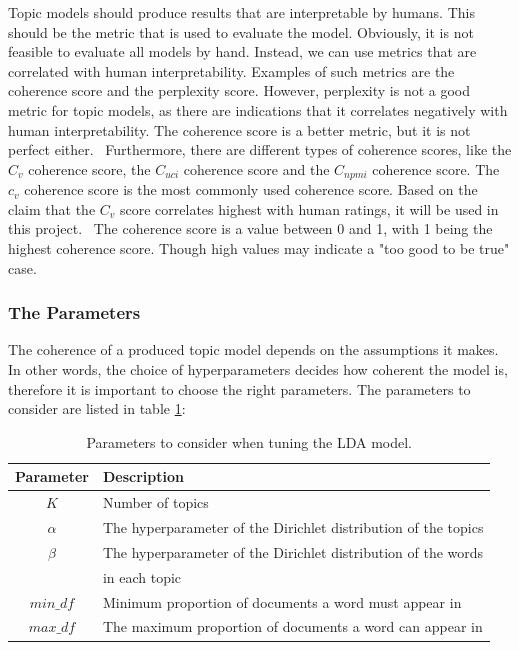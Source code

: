 Topic models should produce results that are interpretable by humans. This should be the metric that is used to evaluate the model. Obviously, it is not feasible to evaluate all models by hand. Instead, we can use metrics that are correlated with human interpretability. Examples of such metrics are the coherence score and the perplexity score. However, perplexity is not a good metric for topic models, as there are indications that it correlates negatively with human interpretability. The coherence score is a better metric, but it is not perfect either.~\cite{egger2022topic} Furthermore, there are different types of coherence scores, like the $C_v$ coherence score, the $C_{uci}$ coherence score and the $C_{npmi}$ coherence score. The $c_v$ coherence score is the most commonly used coherence score. Based on the claim that the $C_v$ score correlates highest with human ratings, it will be used in this project.~\cite{roder2015exploring} The coherence score is a value between 0 and 1, with 1 being the highest coherence score. Though high values may indicate a "too good to be true" case.  %

\subsubsection*{The Parameters}

The coherence of a produced topic model depends on the assumptions it makes. In other words, the choice of hyperparameters decides how coherent the model is, therefore it is important to choose the right parameters. The parameters to consider are listed in table \ref{tab:parameters}:

\begin{table}[h]
    \centering
    \begin{tabular}{cl}
        \hline
        Parameter & Description \\
        \hline
        $K$ & Number of topics \\
        $\alpha$ & The hyperparameter of the Dirichlet distribution of the topics\\
        $\beta$ & The hyperparameter of the Dirichlet distribution of the words  \\
          &  in each topic \\
        $min\_df$ & Minimum proportion of documents a word must appear in \\
        $max\_df$ & The maximum proportion of documents a word can appear in \\
\end{tabular}
    \caption{Parameters to consider when tuning the LDA model.}
    \label{tab:parameters}
\end{table}

